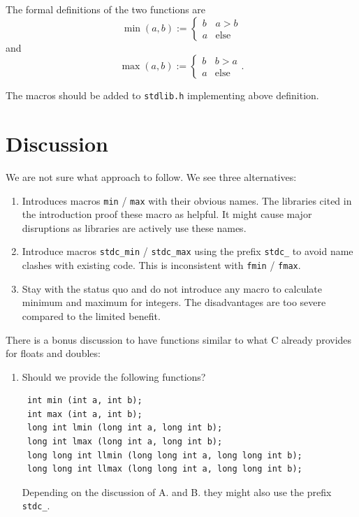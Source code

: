 \documentclass[a4paper,10pt]{scrartcl}
\begin{document}
The formal definitions of the two functions are
\begin{equation*}
 \operatorname{min}(a, b) := \begin{cases}b & a > b\\ a & \text{else}\end{cases}
\end{equation*}
and
\begin{equation*}
 \operatorname{max}(a, b) := \begin{cases}b & b > a\\ a & \text{else}\end{cases}.
\end{equation*}

The macros should be added to \lstinline{stdlib.h} implementing above definition.

\section{Discussion}
We are not sure what approach to follow. We see three alternatives:

\begin{enumerate}
 \item[A.] Introduces macros \lstinline{min} / \lstinline{max} with their obvious names. The
 libraries cited in the introduction proof these macro as helpful. It might cause major
 disruptions as libraries are actively use these names.
 \item[B.] Introduce macros \lstinline{stdc_min} / \lstinline{stdc_max} using the prefix \lstinline{stdc_} to
 avoid name clashes with existing code. This is inconsistent with \lstinline{fmin} / \lstinline{fmax}.
 \item[C.] Stay with the status quo and do not introduce any macro to calculate minimum and maximum for
 integers. The disadvantages are too severe compared to the limited benefit.
\end{enumerate}

There is a bonus discussion to have functions similar to what C already provides for floats and doubles:

\begin{enumerate}
 \item[BONUS.] Should we provide the following functions?
\begin{lstlisting}
 int min (int a, int b);
 int max (int a, int b);
 long int lmin (long int a, long int b);
 long int lmax (long int a, long int b);
 long long int llmin (long long int a, long long int b);
 long long int llmax (long long int a, long long int b);
\end{lstlisting}
Depending on the discussion of A. and B. they might also use the prefix \lstinline{stdc_}.
\end{enumerate}
\end{document}
